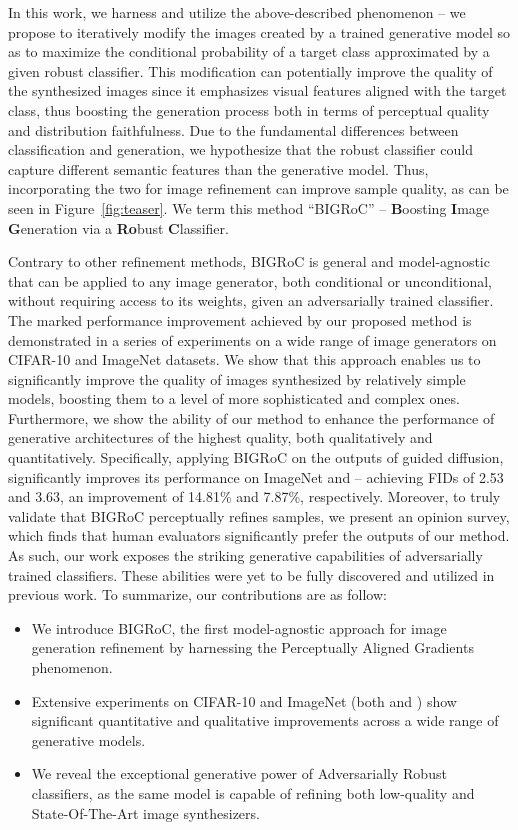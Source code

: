 \documentclass[10pt]{article} \usepackage[accepted]{tmlr}
\begin{document}
In this work, we harness and utilize the above-described phenomenon -- we propose to iteratively modify the images created by a trained generative model so as to maximize the conditional probability of a target class approximated by a given robust classifier. 
This modification can potentially improve the quality of the synthesized images since it emphasizes visual features aligned with the target class, thus boosting the generation process both in terms of perceptual quality and distribution faithfulness.
Due to the fundamental differences between classification and generation, we hypothesize that the robust classifier could capture different semantic features than the generative model. Thus, incorporating the two for image refinement can improve sample quality, as can be seen in Figure~\ref{fig:teaser}.
We term this method ``BIGRoC'' --  \textbf{B}oosting \textbf{I}mage \textbf{G}eneration via a \textbf{Ro}bust \textbf{C}lassifier.

Contrary to other refinement methods, BIGRoC is general and model-agnostic that can be applied to any image generator, both conditional or unconditional, without requiring access to its weights, given an adversarially trained classifier.
The marked performance improvement achieved by our proposed method is demonstrated in a series of experiments on a wide range of image generators on CIFAR-10 and ImageNet datasets.
We show that this approach enables us to significantly improve the quality of images synthesized by relatively simple models, boosting them to a level of more sophisticated and complex ones.
Furthermore, we show the ability of our method to enhance the performance of generative architectures of the highest quality, both qualitatively and quantitatively.
Specifically, applying BIGRoC on the outputs of guided diffusion, \citep{dhariwal2021diffusion} significantly improves its performance on ImageNet  and  -- achieving FIDs of 2.53 and 3.63, an improvement of 14.81\% and 7.87\%, respectively. Moreover, to truly validate that BIGRoC perceptually refines samples, we present an opinion survey, which finds that human evaluators significantly prefer the outputs of our method. As such, our work exposes the striking generative capabilities of adversarially trained classifiers. These abilities were yet to be fully discovered and utilized in previous work.
To summarize, our contributions are as follow:
\begin{itemize}[leftmargin=*]
    \item We introduce BIGRoC, the first model-agnostic approach for image generation refinement by harnessing the Perceptually Aligned Gradients phenomenon.
    \item Extensive experiments on CIFAR-10 and ImageNet (both  and ) show significant quantitative and qualitative improvements across a wide range of generative models.
    \item We reveal the exceptional generative power of Adversarially Robust classifiers, as the same model is capable of refining both low-quality and State-Of-The-Art image synthesizers. 
\end{itemize}
\end{document}
